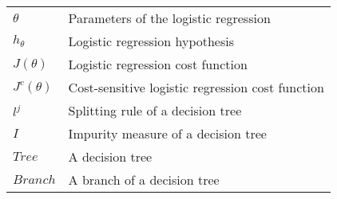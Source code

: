 \begin{tabularx}{\textwidth}{ l X }
$\theta$ & Parameters of the logistic regression \\
$h_\theta $ & Logistic regression hypothesis \\
$J(\theta) $ & Logistic regression cost function \\
$J^c(\theta) $ & Cost-sensitive logistic regression cost function \\
$l^j$ & Splitting rule of a decision tree \\
$I$ & Impurity measure of a decision tree \\
$Tree$ & A decision tree \\
$Branch$& A branch of a decision tree \\
\end{tabularx}
